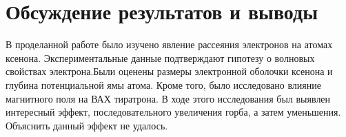 \documentclass[a4paper,12pt]{article}
\begin{document}
		\section{Обсуждение результатов и выводы}
			В проделанной работе было изучено явление рассеяния электронов на атомах ксенона. Экспериментальные данные подтверждают гипотезу о волновых свойствах электрона.Были оценены размеры электронной оболочки ксенона и глубина потенциальной ямы атома. Кроме того, было исследовано влияние магнитного поля на ВАХ тиратрона. В ходе этого исследования был выявлен интересный эффект, последовательного увеличения горба, а затем уменьшения. Объяснить данный эффект не удалось.
			
\end{document}
